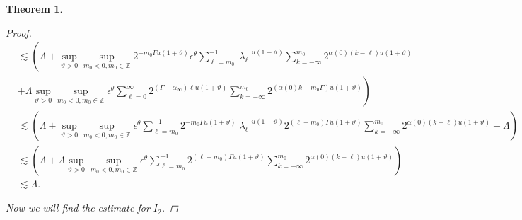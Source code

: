 \documentclass[oneside,reqno]{amsart}
\newtheorem{theorem}{Theorem}[section]
\numberwithin{equation}{section}
\theoremstyle{definition}
\begin{document}
\begin{theorem}
\begin{proof}
\begin{align*}
& \lesssim \left( \Lambda+  \sup_{\vartheta>0 }\sup _{m_0<0  , m_0\in  \mathbb{Z}} 2^{-m_0\Gamma u(1+\vartheta)} \epsilon  ^\theta \sum_{\ell=m_0}^{-1}\left|\lambda_\ell \right|^{u(1+\vartheta)} \sum_{k=-\infty}^{m_0} 2^{\alpha(0)(k-\ell) u(1+\vartheta)}\right.\\
&\left. +\Lambda \sup_{\vartheta>0 }\sup _{m_0<0  , m_0\in  \mathbb{Z}}  \epsilon  ^\theta  \sum_{\ell=0}^{\infty} 2^{\left(\Gamma-\alpha_{\infty}\right) \ell u(1+\vartheta)} \sum_{k=-\infty}^{m_0} 2^{(\alpha(0) k -m_0\Gamma)u(1+\vartheta) }\right) \\
&\lesssim\left( \Lambda+\sup_{\vartheta>0 }\sup _{m_0<0  , m_0\in  \mathbb{Z}}  \epsilon  ^\theta \sum_{\ell=m_0}^{-1} 2^{-m_0\Gamma u(1+\vartheta)}\left|\lambda_\ell \right|^{u(1+\vartheta)} 2^{(\ell-m_0) \Gamma u(1+\vartheta)} \sum_{k=-\infty}^{m_0} 2^{\alpha(0)(k-\ell) u(1+\vartheta)}+\Lambda \right)\\
&\lesssim\left(\Lambda+\Lambda \sup_{\vartheta>0 }\sup _{m_0<0  , m_0\in  \mathbb{Z}}  \epsilon  ^\theta  \sum_{\ell=m_0}^{-1} 2^{(\ell-m_0) \Gamma u(1+\vartheta)} \sum_{k=-\infty}^{m_0} 2^{\alpha(0)(k-\ell) u(1+\vartheta)}\right)\\
& \lesssim \Lambda.
\end{align*}



Now we will find the estimate for $I_2$. 


\end{proof}
\end{theorem}
\end{document}
